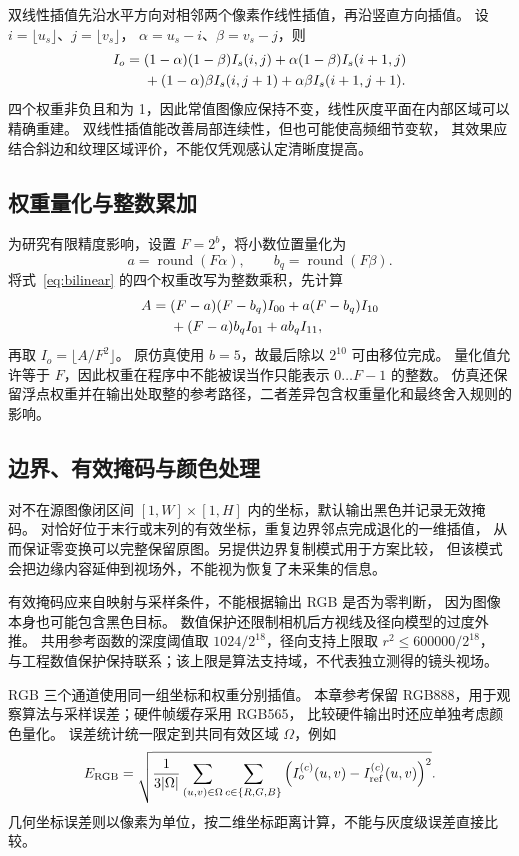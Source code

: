 双线性插值先沿水平方向对相邻两个像素作线性插值，再沿竖直方向插值。
设 $i=\lfloor u_s\rfloor$、$j=\lfloor v_s\rfloor$，
$\alpha=u_s-i$、$\beta=v_s-j$，则
\begin{align}
I_o={}&(1-\alpha)(1-\beta)I_s(i,j)
+\alpha(1-\beta)I_s(i+1,j)\notag\\
&+(1-\alpha)\beta I_s(i,j+1)
+\alpha\beta I_s(i+1,j+1).
\label{eq:bilinear}
\end{align}
四个权重非负且和为 1，因此常值图像应保持不变，线性灰度平面在内部区域可以精确重建。
双线性插值能改善局部连续性，但也可能使高频细节变软，
其效果应结合斜边和纹理区域评价，不能仅凭观感认定清晰度提高。

\subsection{权重量化与整数累加}
为研究有限精度影响，设置 $F=2^b$，将小数位置量化为
\begin{equation}
a=\operatorname{round}(F\alpha),\qquad
b_q=\operatorname{round}(F\beta).
\end{equation}
将式~\eqref{eq:bilinear} 的四个权重改写为整数乘积，先计算
\begin{align}
A={}&(F-a)(F-b_q)I_{00}+a(F-b_q)I_{10}\notag\\
&+(F-a)b_qI_{01}+ab_qI_{11},
\end{align}
再取 $I_o=\lfloor A/F^2\rfloor$。
原仿真使用 $b=5$，故最后除以 $2^{10}$ 可由移位完成。
量化值允许等于 $F$，因此权重在程序中不能被误当作只能表示 $0\ldots F-1$ 的整数。
仿真还保留浮点权重并在输出处取整的参考路径，二者差异包含权重量化和最终舍入规则的影响。

\subsection{边界、有效掩码与颜色处理}
对不在源图像闭区间 $[1,W]\times[1,H]$ 内的坐标，默认输出黑色并记录无效掩码。
对恰好位于末行或末列的有效坐标，重复边界邻点完成退化的一维插值，
从而保证零变换可以完整保留原图。另提供边界复制模式用于方案比较，
但该模式会把边缘内容延伸到视场外，不能视为恢复了未采集的信息。

有效掩码应来自映射与采样条件，不能根据输出 RGB 是否为零判断，
因为图像本身也可能包含黑色目标。
数值保护还限制相机后方视线及径向模型的过度外推。
共用参考函数的深度阈值取 $1024/2^{18}$，径向支持上限取 $r^2\leq600000/2^{18}$，
与工程数值保护保持联系；该上限是算法支持域，不代表独立测得的镜头视场。

RGB 三个通道使用同一组坐标和权重分别插值。
本章参考保留 RGB888，用于观察算法与采样误差；硬件帧缓存采用 RGB565，
比较硬件输出时还应单独考虑颜色量化。
误差统计统一限定到共同有效区域 $\Omega$，例如
\begin{equation}
E_{\rm RGB}=\sqrt{\frac{1}{3|\Omega|}
\sum_{(u,v)\in\Omega}\sum_{c\in\{R,G,B\}}
\left(I_o^{(c)}(u,v)-I_{\rm ref}^{(c)}(u,v)\right)^2}.
\end{equation}
几何坐标误差则以像素为单位，按二维坐标距离计算，不能与灰度级误差直接比较。

